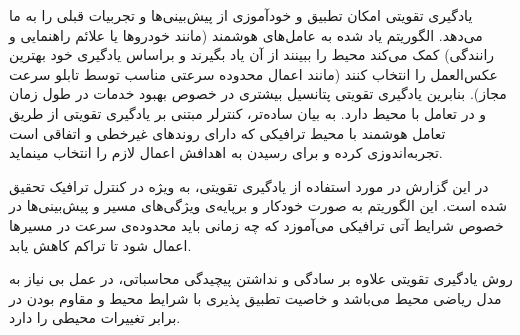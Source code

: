 یادگیری تقویتی امکان تطبیق و خودآموزی از پیش‌بینی‌ها و تجربیات قبلی را به ما می‌دهد. الگوریتم یاد شده به عامل‌های هوشمند (مانند خودروها یا علائم راهنمایی و رانندگی) کمک می‌کند محیط را ببینند از آن یاد بگیرند و براساس یادگیری خود بهترین عکس‌العمل را انتخاب کنند (مانند اعمال محدوده سرعتی مناسب توسط تابلو سرعت مجاز). بنابرین یادگیری تقویتی پتانسیل بیشتری در خصوص بهبود خدمات در طول زمان و در تعامل با محیط دارد.
به بيان ساده‌تر، کنترلر مبتنی بر يادگيری تقويتی از طريق
تعامل هوشمند با محيط ترافيكی که دارای روندهای غيرخطی و اتفاقی است تجربه‌اندوزی کرده و برای رسيدن به اهدافش اعمال لازم را
انتخاب مینمايد.

در این گزارش در مورد استفاده از یادگیری تقویتی، به ویژه  در کنترل ترافیک تحقیق شده است.
این الگوریتم به صورت خودکار و برپایه‌ی ویژگی‌های مسیر و پیش‌بینی‌ها در خصوص شرایط آتی ترافیکی می‌آموزد که چه زمانی باید محدوده‌ی سرعت در مسیرها اعمال شود تا تراکم کاهش یابد.

روش یادگیری تقویتی علاوه بر سادگی و نداشتن پیچیدگی محاسباتی، در عمل بی نیاز به مدل ریاضی محیط می‌باشد و خاصیت تطبیق پذیری با شرایط محیط و مقاوم بودن در برابر تغییرات محیطی را دارد.